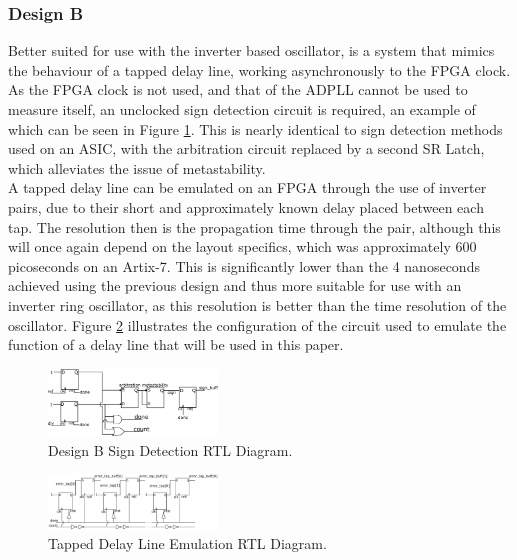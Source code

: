 \documentclass[conference]{IEEEtran}
\begin{document}
\subsubsection*{Design B}
Better suited for use with the inverter based oscillator, is a system that mimics the behaviour of a tapped delay line, working asynchronously to the FPGA clock. As the FPGA clock is not used, and that of the ADPLL cannot be used to measure itself, an unclocked sign detection circuit is required, an example of which can be seen in Figure \ref{fig:segn_pdetdl}. This is nearly identical to sign detection methods used on an ASIC, with the arbitration circuit replaced by a second SR Latch, which alleviates the issue of metastability.\\
A tapped delay line can be emulated on an FPGA through the use of inverter pairs, due to their short and approximately known delay placed between each tap.
The resolution then is the propagation time through the pair, although this will once again depend on the layout specifics, which was approximately 600 picoseconds on an Artix-7. This is significantly lower than the 4 nanoseconds achieved using the previous design and thus more suitable for use with an inverter ring oscillator, as this resolution is better than the time resolution of the oscillator. Figure \ref{fig:num_pdetdl} illustrates the configuration of the circuit used to emulate the function of a delay line that will be used in this paper.
\begin{figure}[h]
    \centering
    \includegraphics[width=0.4\textwidth]{../new_pdet1}
    \caption{Design B Sign Detection RTL Diagram.}
    \label{fig:segn_pdetdl}
    \vspace{-0.5cm}
\end{figure}
\begin{figure}[h]
    \centering
    \includegraphics[width=0.4\textwidth]{../new_pdet2}
    \caption{Tapped Delay Line Emulation RTL Diagram.}
    \label{fig:num_pdetdl}
    \vspace{-0.5cm}
\end{figure}
\end{document}
